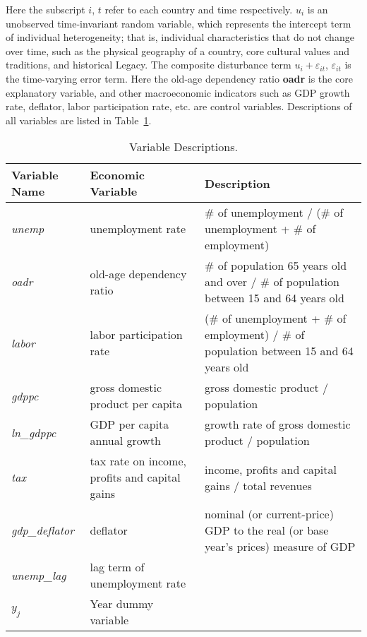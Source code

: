 \documentclass[ %
    final,
    scrbook,
    listoffigures,
    listoftables, 
    glossary]{cu-thesis}
\begin{document}
Here the subscript $i$, $t$ refer to each country and time respectively. $u_i$ is an unobserved time-invariant random variable, which represents the intercept term of individual heterogeneity; that is, individual characteristics that do not change over time, such as the physical geography of a country, core cultural values and traditions, and historical Legacy. The composite disturbance term $u_i+\varepsilon_{it}$, $\varepsilon_{it}$ is the time-varying error term. Here the old-age dependency ratio \textbf{oadr} is the core explanatory variable, and other macroeconomic indicators such as GDP growth rate, deflator, labor participation rate, etc. are control variables. Descriptions of all variables are listed in Table~\ref{table:1}.
\begin{center}
\begin{longtable}{|m{5em}|m{6cm}|m{6cm}|}
\caption{Variable Descriptions.} \label{table:1} \\
\hline
\textbf{Variable Name} & \textbf{Economic Variable} & \textbf{Description} \\ 
\hline
\endhead %
\textit{unemp} & unemployment rate & \# of unemployment / (\# of unemployment + \# of employment) \\ 
\hline
\textit{oadr} & old-age dependency ratio & \# of population 65 years old and over / \# of population between 15 and 64 years old\\ 
\hline
\textit{labor} & labor participation rate & (\# of unemployment + \# of employment) / \# of population between 15 and 64 years old \\
\hline
\textit{gdppc} & gross domestic product per capita & gross domestic product / population \\
\hline
\textit{ln\_gdppc} & GDP per capita annual growth &  growth rate of gross domestic product / population\\
\hline
\textit{tax} & tax rate on income, profits and capital gains& income, profits and capital gains / total revenues \\
\hline
\textit{gdp\_deflator} & deflator &  nominal (or current-price) GDP to the real (or base year's prices) measure of GDP \\
\hline
\textit{unemp\_lag} & lag term of unemployment rate & \\
\hline
$y_{j}$ & Year dummy variable & \\
\hline
\end{longtable}
\end{center}
\end{document}
